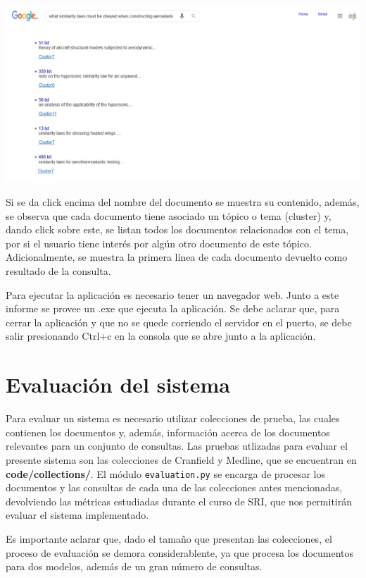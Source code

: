 \documentclass[twoside]{article}
\begin{document}
\includegraphics[scale=0.4]{img/clusters.jpg}

Si se da click encima del nombre del documento se muestra su contenido, adem\'as, se observa que cada documento tiene asociado un t\'opico o tema (cluster) y, dando click sobre este, se listan todos los documentos relacionados con el tema, por si el usuario tiene inter\'es por alg\'un otro documento de este t\'opico. Adicionalmente, se muestra la primera l\'inea de cada documento devuelto como resultado de la consulta.

Para ejecutar la aplicaci\'on es necesario tener un navegador web. Junto a este informe se provee un .exe que ejecuta la aplicaci\'on. Se debe aclarar que, para cerrar la aplicaci\'on y que no se quede corriendo el servidor en el puerto, se debe salir presionando Ctrl+c en la consola que se abre junto a la aplicaci\'on.



\section{Evaluaci\'on del sistema}
\qquad Para evaluar un sistema es necesario utilizar colecciones de prueba, las cuales contienen los documentos y, adem\'as, informaci\'on acerca de los documentos relevantes para un conjunto de consultas. Las pruebas utlizadas para evaluar el presente sistema son las colecciones de Cranfield y Medline, que se encuentran en \textbf{code/collections/}. El m\'odulo \texttt{evaluation.py} se encarga de procesar los documentos y las consultas de cada una de las colecciones antes mencionadas, devolviendo las m\'etricas estudiadas durante el curso de SRI, que nos permitir\'an evaluar el sistema implementado.

Es importante aclarar que, dado el tama\~no que presentan las colecciones, el proceso de evaluaci\'on se demora considerablente, ya que procesa los documentos para dos modelos, adem\'as de un gran n\'umero de consultas.
\end{document}
